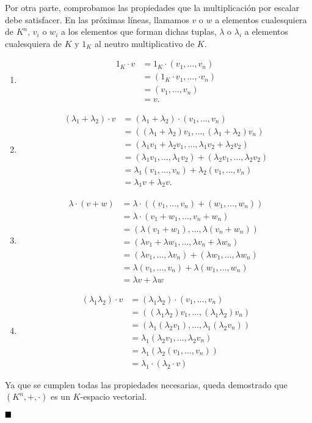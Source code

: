 Por otra parte, comprobamos las propiedades que la multiplicación por escalar debe satisfacer. En las próximas líneas, llamamos $v$ o $w$ a elementos cualesquiera de $K^n$, $v_i$ o $w_i$ a los elementos que forman dichas tuplas, $\lambda$ o $\lambda_i$ a elementos cualesquiera de $K$ y $1_K$ al neutro multiplicativo de $K$.
\begin{enumerate}[label=\alph*)]
	\item
	\begin{align*}
		1_K\cdot v &= 1_K\cdot(v_1,\dots,v_n)\\
		&= (1_K\cdot v_1,\dots,\cdot v_n)\\
		&= (v_1,\dots,v_n)\\
		&= v.
	\end{align*}
	\item
	\begin{align*}
		(\lambda_1 + \lambda_2)\cdot v &= (\lambda_1 + \lambda_2)\cdot(v_1,\dots,v_n)\\
		&= ((\lambda_1 + \lambda_2)v_1,\dots,(\lambda_1 + \lambda_2)v_n)\\
		&= (\lambda_1v_1 + \lambda_2v_1,\dots,\lambda_1v_2 + \lambda_2v_2)\\
		&= (\lambda_1v_1,\dots,\lambda_1v_2) + (\lambda_2v_1,\dots,\lambda_2v_2)\\
		&= \lambda_1(v_1,\dots,v_n) + \lambda_2(v_1,\dots,v_n)\\
		&= \lambda_1v + \lambda_2v.
	\end{align*}
	\item
	\begin{align*}
		\lambda\cdot(v + w) &= \lambda\cdot((v_1,\dots,v_n) + (w_1,\dots,w_n))\\
		&= \lambda\cdot(v_1+w_1,\dots,v_n+w_n)\\
		&= (\lambda(v_1+w_1),\dots,\lambda(v_n+w_n))\\
		&= (\lambda v_1+ \lambda w_1,\dots,\lambda v_n+\lambda w_n)\\
		&= (\lambda v_1, \dots, \lambda v_n) + (\lambda w_1, \dots, \lambda w_n)\\
		&= \lambda(v_1,\dots,v_n) + \lambda(w_1,\dots,w_n)\\
		&= \lambda v + \lambda w
	\end{align*}
	\item
	\begin{align*}
		(\lambda_1\lambda_2)\cdot v &= (\lambda_1\lambda_2)\cdot(v_1,\dots,v_n)\\
		&= ((\lambda_1\lambda_2)v_1,\dots,(\lambda_1\lambda_2)v_n)\\
		&= (\lambda_1(\lambda_2v_1),\dots,\lambda_1(\lambda_2v_n))\\
		&= \lambda_1(\lambda_2v_1,\dots,\lambda_2v_n)\\
		&= \lambda_1(\lambda_2(v_1,\dots,v_n))\\
		&= \lambda_1\cdot(\lambda_2\cdot v)
	\end{align*}
\end{enumerate}

Ya que se cumplen todas las propiedades necesarias, queda demostrado que $(K^n, +, \cdot)$ es un $K$-espacio vectorial.

$\qed$